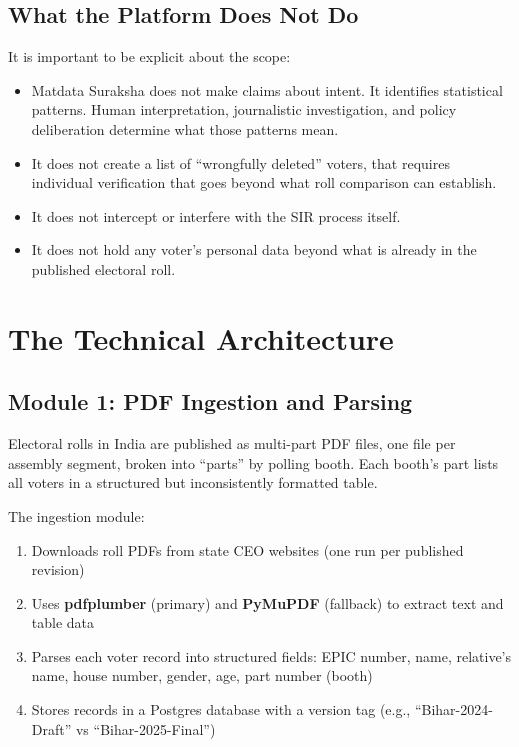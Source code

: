 \documentclass[11pt, a4paper]{article}
\begin{document}
\subsection{What the Platform Does Not Do}

It is important to be explicit about the scope:

\begin{itemize}[leftmargin=1.5em, itemsep=3pt]
  \item Matdata Suraksha does not make claims about intent. It identifies statistical patterns. Human interpretation, journalistic investigation, and policy deliberation determine what those patterns mean.
  \item It does not create a list of ``wrongfully deleted'' voters, that requires individual verification that goes beyond what roll comparison can establish.
  \item It does not intercept or interfere with the SIR process itself.
  \item It does not hold any voter's personal data beyond what is already in the published electoral roll.
\end{itemize}

\section{The Technical Architecture}

\subsection{Module 1: PDF Ingestion and Parsing}

Electoral rolls in India are published as multi-part PDF files, one file per assembly segment, broken into ``parts'' by polling booth. Each booth's part lists all voters in a structured but inconsistently formatted table.

The ingestion module:

\begin{enumerate}[leftmargin=1.5em, itemsep=4pt]
  \item Downloads roll PDFs from state CEO websites (one run per published revision)
  \item Uses \textbf{pdfplumber} (primary) and \textbf{PyMuPDF} (fallback) to extract text and table data
  \item Parses each voter record into structured fields: EPIC number, name, relative's name, house number, gender, age, part number (booth)
  \item Stores records in a Postgres database with a version tag (e.g., ``Bihar-2024-Draft'' vs ``Bihar-2025-Final'')
\end{enumerate}
\end{document}
